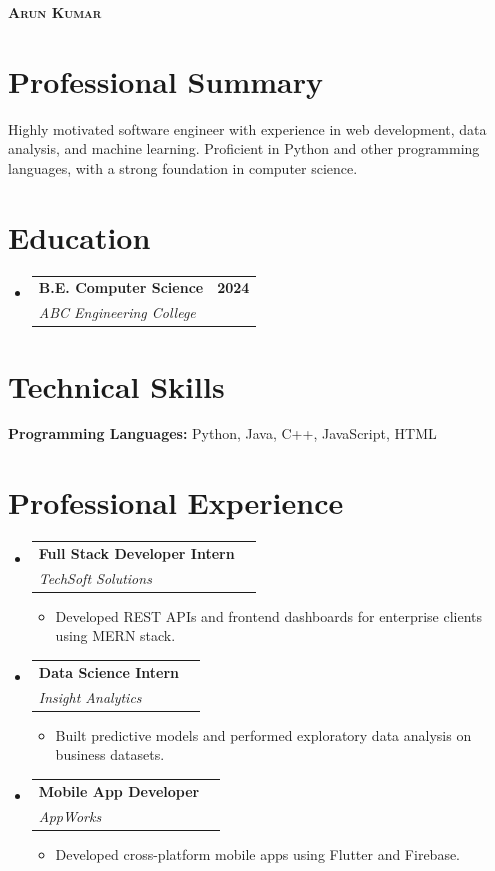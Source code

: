 \documentclass[a4paper,10pt]{article}
\makeatletter
\newcommand{\resumeItem}[1]{
  \item\small{#1 \vspace{-2pt}}
}
\newcommand{\resumeSubheading}[4]{
  \vspace{-1pt}\item
    \begin{tabular*}{0.97\textwidth}[t]{l@{\extracolsep{\fill}}r}
      \textbf{#1} & \textbf{#2} \\
      \textit{\small#3} & \textit{\small #4} \\
    \end{tabular*}\vspace{-5pt}
}
\newcommand{\resumeSubHeadingListStart}{\begin{itemize}[leftmargin=0.15in, label={}]}
\newcommand{\resumeSubHeadingListEnd}{\end{itemize}}
\newcommand{\resumeItemListStart}{\begin{itemize}[leftmargin=0.2in]}
\newcommand{\resumeItemListEnd}{\end{itemize}\vspace{-5pt}}
\makeatother
\begin{document}
\begin{minipage}[t]{0.75\textwidth}
  \begin{center}
    {\Huge\bfseries\scshape Arun Kumar} \\[8pt]
    \small 
      \end{center}
\end{minipage}%

\vspace{8pt}

\section{Professional Summary}
\small{Highly motivated software engineer with experience in web development, data analysis, and machine learning. Proficient in Python and other programming languages, with a strong foundation in computer science.}
\vspace{6pt}


\section{Education}
\resumeSubHeadingListStart
  \resumeSubheading
    {B.E. Computer Science}{2024}
    {ABC Engineering College}{}
\resumeSubHeadingListEnd
\vspace{4pt}

\section{Technical Skills}
\small{
    \textbf{Programming Languages:} Python, Java, C++, JavaScript, HTML \\
  }
\vspace{6pt}

\section{Professional Experience}
\resumeSubHeadingListStart
  \resumeSubheading
    {Full Stack Developer Intern}{}
    {TechSoft Solutions}{}
        \resumeItemListStart
            \resumeItem{Developed REST APIs and frontend dashboards for enterprise clients using MERN stack.}
          \resumeItemListEnd
          \resumeSubheading
    {Data Science Intern}{}
    {Insight Analytics}{}
        \resumeItemListStart
            \resumeItem{Built predictive models and performed exploratory data analysis on business datasets.}
          \resumeItemListEnd
          \resumeSubheading
    {Mobile App Developer}{}
    {AppWorks}{}
        \resumeItemListStart
            \resumeItem{Developed cross-platform mobile apps using Flutter and Firebase.}
          \resumeItemListEnd
        \resumeSubHeadingListEnd
\vspace{4pt}
\end{document}
